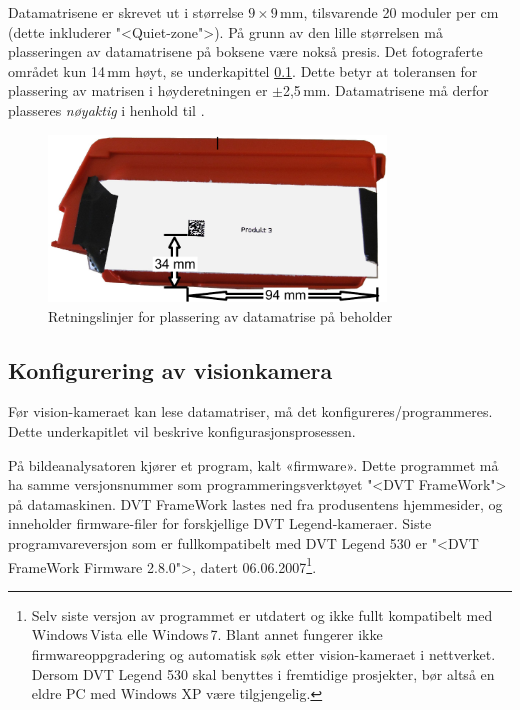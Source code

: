 \documentclass[Visionprosjekt.tex]{subfiles}
\begin{document}
Datamatrisene er skrevet ut i størrelse $9\times9$\,mm, tilsvarende 20 moduler per cm (dette inkluderer "<Quiet-zone">). På grunn av den lille størrelsen må plasseringen av datamatrisene på boksene være nokså presis.
Det fotograferte området kun 14\,mm høyt, se underkapittel \ref{subsection(Konfigurering-av-visionkamera)}.
  Dette betyr at  toleransen for plassering av matrisen i høyderetningen er $\pm$2,5\,mm. Datamatrisene må derfor plasseres \emph{nøyaktig} i henhold til .



\begin{figure}
	\centering
		\includegraphics[width=0.8\textwidth]{bilder/plasseringdatamatrise.pdf}
	\caption{Retningslinjer for plassering av datamatrise på beholder}
	\label{fig:plasseringdatamatrise}
\end{figure}












\subsection{Konfigurering av visionkamera}\label{subsection(Konfigurering-av-visionkamera)}
Før vision-kameraet kan lese datamatriser, må det konfigureres/programmeres. Dette underkapitlet vil beskrive konfigurasjonsprosessen.

På bildeanalysatoren kjører et program, kalt «firmware». Dette programmet må ha samme versjonsnummer som programmeringsverktøyet "<DVT \mbox{FrameWork}"> på datamaskinen.
DVT \mbox{FrameWork}  lastes ned fra produsentens hjemmesider, og inneholder firmware-filer for forskjellige DVT Legend-kameraer. Siste programvareversjon som er fullkompatibelt med DVT Legend 530 er "<DVT \mbox{FrameWork} \mbox{Firmware}  2.8.0">, datert 06.06.2007\footnote{Selv siste versjon av programmet er  utdatert og  ikke fullt kompatibelt med Windows\,Vista elle Windows\,7. Blant annet fungerer ikke firmwareoppgradering og automatisk søk etter vision-kameraet i nettverket.  Dersom DVT Legend 530 skal benyttes i fremtidige prosjekter, bør altså en eldre PC med Windows XP være tilgjengelig.}.
\end{document}
